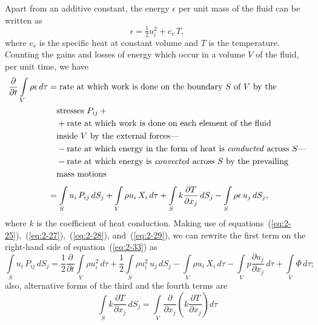 Apart from an additive constant, the energy $\epsilon$ per unit mass of the
fluid can be written as
\begin{equation}
\label{eq:2-32}
\epsilon = \tfrac{1}{2}u_i^2 + c_v\,T,
\end{equation}
where $c_v$ is the specific heat at constant volume and $T$ is the temperature.
Counting the gains and losses of energy which occur in a volume $V$ of
the fluid, per unit time, we have
\begin{align}
\label{eq:2-33}
\frac{\partial}{\partial t}\int\limits_V \rho\epsilon\,d\tau &= \text{rate at which work is done on the boundary } S \text{ of } V \text{ by the} \notag\\
& \quad\text{stresses } P_{ij} + {} \notag\\
& \quad{} + \text{rate at which work is done on each element of the fluid} \notag\\
& \quad\text{inside } V \text{ by the external forces---} \notag\\
& \quad{} - \text{rate at which energy in the form of heat is \emph{conducted} across } S\text{---} \notag\\
& \quad{} - \text{rate at which energy is \emph{convected} across } S \text{ by the prevailing} \notag\\
& \quad\text{mass motions} \notag\\[4pt]
&= \int\limits_S u_i\,P_{ij}\,dS_j + \int\limits_V \rho u_i\,X_i\,d\tau + \int\limits_S k\frac{\partial T}{\partial x_j}\,dS_j - \int\limits_S \rho\epsilon\,u_j\,dS_j,
\end{align}
where $k$ is the coefficient of heat conduction. Making use of equations~(\ref{eq:2-25}),~(\ref{eq:2-27}),~(\ref{eq:2-28}), and~(\ref{eq:2-29}), we can rewrite the first term on the
right-hand side of equation~(\ref{eq:2-33}) as
\begin{equation}
\label{eq:2-34}
\int\limits_S u_i\,P_{ij}\,dS_j = \frac{1}{2}\frac{\partial}{\partial t}\int\limits_V \rho u_i^2\,d\tau + \frac{1}{2}\int\limits_S \rho u_i^2\,u_j\,dS_j - \int\limits_V \rho u_i\,X_i\,d\tau - \int\limits_V p\frac{\partial u_j}{\partial x_j}\,d\tau + \int\limits_V \Phi\,d\tau;
\end{equation}
also, alternative forms of the third and the fourth terms are
\begin{equation}
\label{eq:2-35}
\int\limits_S k\frac{\partial T}{\partial x_j}\,dS_j = \int\limits_V \frac{\partial}{\partial x_j}\!\left(k\frac{\partial T}{\partial x_j}\right)d\tau
\end{equation}
